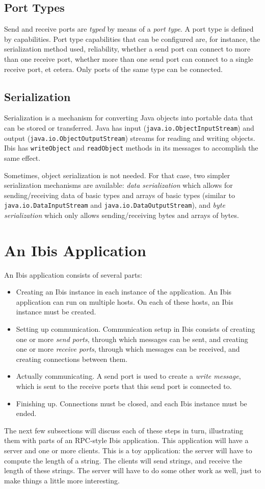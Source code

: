 \documentclass[10pt]{article}
\newcommand{\mysection}[1]{\section{#1}\label{#1}}
\newcommand{\mysubsection}[1]{\subsection{#1}\label{#1}}
\begin{document}
\mysubsection{Port Types}

Send and receive ports are \emph{typed} by means of a \emph{port type}.
A port type is defined by capabilities.
Port type capabilities that can be configured are, for instance, the
serialization method used, reliability, whether a send port can connect
to more than one receive port, whether more than one send port can connect
to a single receive port, et cetera.
Only ports of the same type can be connected.

\mysubsection{Serialization}

Serialization is a mechanism for converting Java objects
into portable data that can be stored or transferred.
Java has input
(\texttt{java.io.ObjectInputStream})
and output
(\texttt{java.io.ObjectOutputStream})
streams for reading and writing
objects.
Ibis has \texttt{writeObject} and \texttt{readObject} methods in
its messages to accomplish the same effect. 

Sometimes, object serialization is not needed. For that case,
two simpler serialization mechanisms are available: \emph{data
serialization} which allows for sending/receiving data of basic types
and arrays of basic types (similar to \texttt{java.io.DataInputStream}
and \texttt{java.io.DataOutputStream}), and \emph{byte serialization}
which only allows sending/receiving bytes and arrays of bytes.

\mysection{An Ibis Application}

An Ibis application consists of several parts:
\begin{itemize}
\item
Creating an Ibis instance in each instance of the application.
An Ibis application can run on multiple hosts.
On each of these hosts, an Ibis instance must be created.
\item
Setting up communication. Communication setup in Ibis
consists of creating one or more \emph{send ports}, through which messages
can be sent, and creating one or more \emph{receive ports},
through which messages can be received, and creating connections between them.
\item
Actually communicating. A send port is used to create a 
\emph{write message}, which is sent to the receive ports that this send port
is connected to.
\item
Finishing up. Connections must be closed, and each Ibis instance must
be ended.
\end{itemize}
\noindent
The next few subsections will discuss each of these steps in turn,
illustrating them with parts of an RPC-style Ibis application.
This application will have a server and one or more clients. This is a toy
application: the server will have to compute the length of a string.
The clients will send strings, and receive the length of these strings.
The server will have to do some other work as well, just to make
things a little more interesting.
\end{document}
